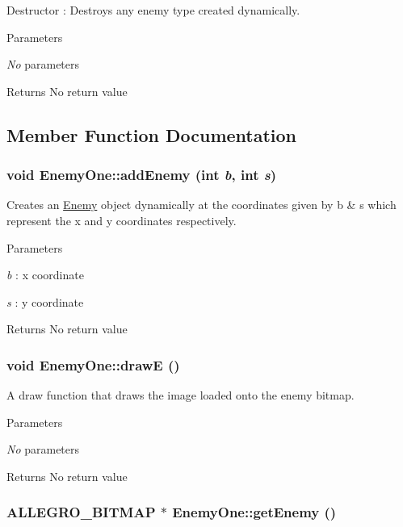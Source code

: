 Destructor : Destroys any enemy type created dynamically. 
\begin{DoxyParams}{Parameters}
\item[{\em No}]parameters \end{DoxyParams}
\begin{DoxyReturn}{Returns}
No return value 
\end{DoxyReturn}


\subsection{Member Function Documentation}
\hypertarget{classEnemyOne_a428e216932e0a454b59b705f62d1c1a0}{
\subsubsection[{addEnemy}]{\setlength{\rightskip}{0pt plus 5cm}void EnemyOne::addEnemy (int {\em b}, \/  int {\em s})}}
\label{classEnemyOne_a428e216932e0a454b59b705f62d1c1a0}


Creates an \hyperlink{classEnemy}{Enemy} object dynamically at the coordinates given by b \& s which represent the x and y coordinates respectively. 
\begin{DoxyParams}{Parameters}
\item[{\em b}]: x coordinate \item[{\em s}]: y coordinate \end{DoxyParams}
\begin{DoxyReturn}{Returns}
No return value 
\end{DoxyReturn}
\hypertarget{classEnemyOne_a8017eb7f3cf8510043e542ed5314fbf9}{
\subsubsection[{drawE}]{\setlength{\rightskip}{0pt plus 5cm}void EnemyOne::drawE ()}}
\label{classEnemyOne_a8017eb7f3cf8510043e542ed5314fbf9}


A draw function that draws the image loaded onto the enemy bitmap. 
\begin{DoxyParams}{Parameters}
\item[{\em No}]parameters \end{DoxyParams}
\begin{DoxyReturn}{Returns}
No return value 
\end{DoxyReturn}
\hypertarget{classEnemyOne_a348b86c31e258c7ccf83a4f44397f542}{
\subsubsection[{getEnemy}]{\setlength{\rightskip}{0pt plus 5cm}ALLEGRO\_\-BITMAP $\ast$ EnemyOne::getEnemy ()}}
\label{classEnemyOne_a348b86c31e258c7ccf83a4f44397f542}


